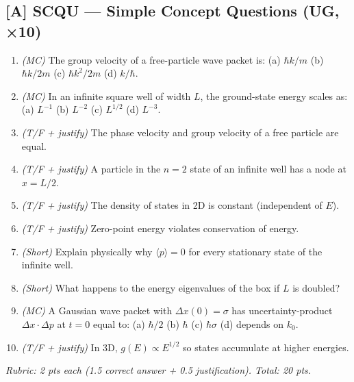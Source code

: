 \subsection*{[A] SCQU — Simple Concept Questions (UG, ×10)}
\begin{tcolorbox}[ugconceptbox, title={SCQU · L01 · Tiers 1–3 · 15–20 min}]
\begin{enumerate}[label=\textbf{Q\arabic*.}]
  \item \textit{(MC)} The group velocity of a free-particle wave packet is:
    (a) $\hbar k/m$ \quad (b) $\hbar k/2m$ \quad (c) $\hbar k^2/2m$ \quad (d) $k/\hbar$.
  \item \textit{(MC)} In an infinite square well of width $L$, the ground-state energy scales as:
    (a) $L^{-1}$ \quad (b) $L^{-2}$ \quad (c) $L^{1/2}$ \quad (d) $L^{-3}$.
  \item \textit{(T/F + justify)} The phase velocity and group velocity of a free particle are equal.
  \item \textit{(T/F + justify)} A particle in the $n=2$ state of an infinite well has a node at $x = L/2$.
  \item \textit{(T/F + justify)} The density of states in 2D is constant (independent of $E$).
  \item \textit{(T/F + justify)} Zero-point energy violates conservation of energy.
  \item \textit{(Short)} Explain physically why $\langle p \rangle = 0$ for every stationary state of the infinite well.
  \item \textit{(Short)} What happens to the energy eigenvalues of the box if $L$ is doubled?
  \item \textit{(MC)} A Gaussian wave packet with $\Delta x(0) = \sigma$ has uncertainty-product $\Delta x \cdot \Delta p$ at $t=0$ equal to:
    (a) $\hbar/2$ \quad (b) $\hbar$ \quad (c) $\hbar\sigma$ \quad (d) depends on $k_0$.
  \item \textit{(T/F + justify)} In 3D, $g(E) \propto E^{1/2}$ so states accumulate at higher energies.
\end{enumerate}
\textit{Rubric: 2 pts each (1.5 correct answer + 0.5 justification). Total: 20 pts.}
\end{tcolorbox}

